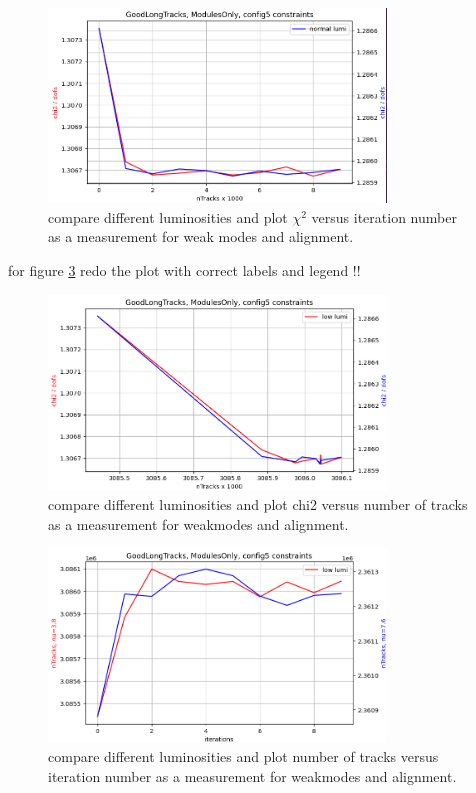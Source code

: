 
\begin{figure}
  \centering
  \includegraphics[width=0.8\textwidth]{plots/jan_17_2022/chi2_iter_low_vs_normal.png}
  \caption{compare different luminosities and plot $\chi^2$ versus iteration number as a measurement for weak modes and alignment.}
  \label{fig:chi2iter_lumi_normal}
\end{figure}

for figure \ref{fig:chi2iter_lumi_normal} redo the plot with correct labels and legend !!

\begin{figure}
  \centering
  \includegraphics[width=0.8\textwidth]{plots/jan_17_2022/chi2_tracks_modulesOnly.png}
  \caption{compare different luminosities and plot chi2 versus number of tracks as a measurement for weakmodes and alignment.}
  \label{fig:chi2tracks_lumi_normal}
\end{figure}

\begin{figure}
  \centering
  \includegraphics[width=0.8\textwidth]{plots/jan_17_2022/tracks_vs_iterations_modulesOnly.png}
  \caption{compare different luminosities and plot number of tracks versus iteration number as a measurement for weakmodes and alignment.}
  \label{fig:chi2iter_lumi_normal}
\end{figure}

